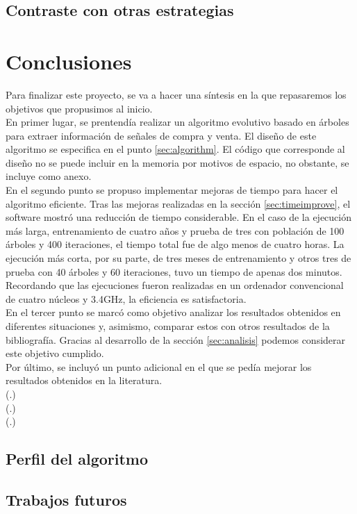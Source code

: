 \subsection{Contraste con otras estrategias}


\newpage

\section{Conclusiones}
Para finalizar este proyecto, se va a hacer una s\'intesis en la que repasaremos los objetivos que propusimos al inicio.\\

En primer lugar, se prentend\'ia realizar un algoritmo evolutivo basado en \'arboles para extraer informaci\'on de se\~nales de compra y venta. El dise\~no de este algoritmo se especifica en el punto \ref{sec:algorithm}. El c\'odigo que corresponde al dise\~no no se puede incluir en la memoria por motivos de espacio, no obstante, se incluye como anexo.\\

En el segundo punto se propuso implementar mejoras de tiempo para hacer el algoritmo eficiente. Tras las mejoras realizadas en la secci\'on \ref{sec:timeimprove}, el software mostr\'o una reducci\'on de tiempo considerable. En el caso de la ejecuci\'on m\'as larga, entrenamiento de cuatro a\~nos y prueba de tres con poblaci\'on de 100 \'arboles y 400 iteraciones, el tiempo total fue de algo menos de cuatro horas. La ejecuci\'on m\'as corta, por su parte, de tres meses de entrenamiento y otros tres de prueba con 40 \'arboles y 60 iteraciones, tuvo un tiempo de apenas dos minutos. Recordando que las ejecuciones fueron realizadas en un ordenador convencional de cuatro n\'ucleos y 3.4GHz, la eficiencia es satisfactoria.\\

En el tercer punto se marc\'o como objetivo analizar los resultados obtenidos en diferentes situaciones y, asimismo, comparar estos con otros resultados de la bibliograf\'ia. Gracias al desarrollo de la secci\'on \ref{sec:analisis} podemos considerar este objetivo cumplido.\\

Por \'ultimo, se incluy\'o un punto adicional en el que se ped\'ia mejorar los resultados obtenidos en la literatura.\\

(.)\\

(.)\\

(.)\\


\subsection{Perfil del algoritmo}



\subsection{Trabajos futuros}


